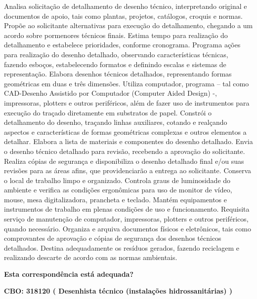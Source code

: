 \documentclass[
]{article}
\begin{document}
Analisa solicitação de detalhamento de desenho técnico, interpretando
original e documentos de apoio, tais como plantas, projetos, catálogos,
croquis e normas. Propõe ao solicitante alternativas para execução do
detalhamento, chegando a um acordo sobre pormenores técnicos finais.
Estima tempo para realização do detalhamento e estabelece prioridades,
conforme cronograma. Programa ações para realização do desenho
detalhado, observando características técnicas, fazendo esboços,
estabelecendo formatos e definindo escalas e sistemas de representação.
Elabora desenhos técnicos detalhados, representando formas geométricas
em duas e três dimensões. Utiliza computador, programa -- tal como
CAD-Desenho Assistido por Computador (Computer Aided Design) -,
impressoras, plotters e outros periféricos, além de fazer uso de
instrumentos para execução do traçado diretamente em substratos de
papel. Constrói o detalhamento do desenho, traçando linhas auxiliares,
cotando e realçando aspectos e características de formas geométricas
complexas e outros elementos a detalhar. Elabora a lista de materiais e
componentes do desenho detalhado. Envia o desenho técnico detalhado para
revisão, recebendo a aprovação do solicitante. Realiza cópias de
segurança e disponibiliza o desenho detalhado final e/ou suas revisões
para as áreas afins, que providenciarão a entrega ao solicitante.
Conserva o local de trabalho limpo e organizado. Controla graus de
luminosidade do ambiente e verifica as condições ergonômicas para uso de
monitor de vídeo, mouse, mesa digitalizadora, prancheta e teclado.
Mantém equipamentos e instrumentos de trabalho em plenas condições de
uso e funcionamento. Requisita serviço de manutenção de computador,
impressoras, plotters e outros periféricos, quando necessário. Organiza
e arquiva documentos físicos e eletrônicos, tais como comprovantes de
aprovação e cópias de segurança dos desenhos técnicos detalhados.
Destina adequadamente os resíduos gerados, fazendo reciclagem e
realizando descarte de acordo com as normas ambientais.

\begin{Form}
\textbf{Esta correspondência está adequada?} \\ 
\end{Form}

\textbf{CBO: 318120  ( Desenhista técnico (instalações hidrossanitárias) )}
\end{document}
